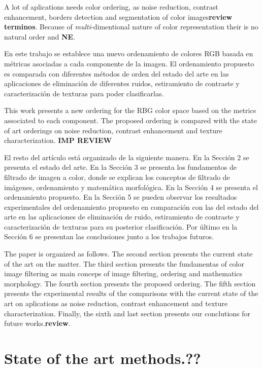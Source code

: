 A lot of aplications needs color ordering, as noise reduction, contrast enhancement, borders detection and segmentation of color images\textbf{review terminos}\cite{ortiz2002procesamiento}. Because of \textit{multi}-dimentional nature of color representation their is no natural order and \textbf{NE}.

En este trabajo se establece una nuevo ordenamiento de colores RGB basada en m\'etricas asociadas a cada  componente de la imagen.  El ordenamiento propuesto es comparada con diferentes m\'etodos de orden del estado del arte en las aplicaciones de eliminaci\'on de diferentes ruidos, estiramiento de contraste y caracterización de texturas para poder clasificarlas.

This work presents a new ordering for the RBG color space based on the metrics associated to each component. The proposed ordering is compared with the state of art orderings on noise reduction, contrast enhancement and texture characterization. \textbf{IMP REVIEW}

El resto del art\'iculo est\'a organizado de la siguiente manera. En la Secci\'on 2 se presenta el estado del arte. En la Secci\'on 3 se presenta los fundamentos de filtrado de imagen a color, donde se explican	los conceptos de filtrado de im\'agenes, ordenamiento y matem\'atica morfol\'ogica. En la Secci\'on 4 se presenta el  ordenamiento propuesto. En la Secci\'on 5 se pueden observar los resultados experimentales del ordenamiento propuesto en comparaci\'on con las del estado del arte en las aplicaciones de  eliminaci\'on de ruido, estiramiento de contraste y caracterización de texturas para su posterior clasificaci\'on. Por \'ultimo en la Secci\'on 6 se presentan las conclusiones junto a los trabajos futuros.

The paper is organized as follows. The second section presents the current state of the art on the matter. The third section presents the fundamentas of color image filtering as main conceps of image filtering, ordering and mathematics morphology. The fourth section presents the proposed ordering. The fifth section presents the experimental results of the comparisons with the current state of the art on aplications as noise reduction, contrast enhancement and texture characterization. Finally, the sixth and last section presents our conclutions for future works.\textbf{review}.

\section{State of the art \textbf{methods.??}}
\label{Relacionados}

